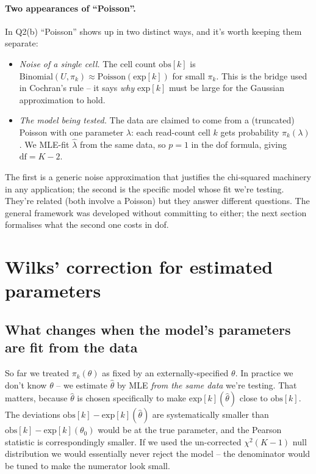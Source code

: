 \documentclass[11pt]{article}
\newcommand{\Pois}{\mathrm{Poisson}}
\newcommand{\Bin}{\mathrm{Binomial}}
\newcommand{\obs}{\mathrm{obs}}
\newcommand{\expc}{\mathrm{exp}}
\begin{document}
\paragraph{Two appearances of ``Poisson''.}
In Q2(b) ``Poisson'' shows up in two distinct ways, and it's worth keeping
them separate:
\begin{itemize}[leftmargin=2em,itemsep=2pt]
\item \emph{Noise of a single cell.} The cell count $\obs[k]$ is
       $\Bin(U, \pi_k) \approx \Pois(\expc[k])$ for small $\pi_k$. This is
       the bridge used in Cochran's rule -- it says \emph{why} $\expc[k]$
       must be large for the Gaussian approximation to hold.
\item \emph{The model being tested.} The data are claimed to come from a
       (truncated) Poisson with one parameter $\lambda$: each read-count
       cell $k$ gets probability $\pi_k(\lambda)$. We MLE-fit
       $\hat\lambda$ from the same data, so $p = 1$ in the dof formula,
       giving $\mathrm{df} = K - 2$.
\end{itemize}
The first is a generic noise approximation that justifies the chi-squared
machinery in any application; the second is the specific model whose fit
we're testing. They're related (both involve a Poisson) but they answer
different questions. The general framework was developed without committing
to either; the next section formalises what the second one costs in dof.

\section{Wilks' correction for estimated parameters}
\label{sec:wilks}

\subsection{What changes when the model's parameters are fit from the data}

So far we treated $\pi_k(\theta)$ as fixed by an externally-specified
$\theta$. In practice we don't know $\theta$ -- we estimate $\hat\theta$ by
MLE \emph{from the same data} we're testing. That matters, because
$\hat\theta$ is chosen specifically to make $\expc[k](\hat\theta)$ close to
$\obs[k]$. The deviations $\obs[k] - \expc[k](\hat\theta)$ are systematically
smaller than $\obs[k] - \expc[k](\theta_0)$ would be at the true parameter,
and the Pearson statistic is correspondingly smaller. If we used the
un-corrected $\chi^{2}(K-1)$ null distribution we would essentially never
reject the model -- the denominator would be tuned to make the numerator
look small.
\end{document}
